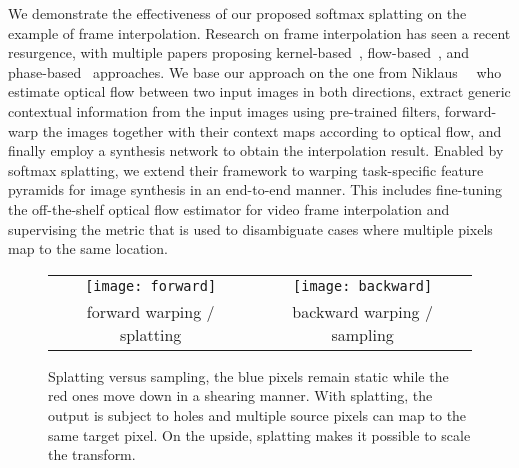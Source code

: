 \documentclass[10pt,twocolumn,letterpaper]{article}
\newlength{\itemwidth}
\begin{document}
We demonstrate the effectiveness of our proposed softmax splatting on the example of frame interpolation. Research on frame interpolation has seen a recent resurgence, with multiple papers proposing kernel-based~\cite{Bao_CVPR_2019, Bao_ARXIV_2018, Niklaus_CVPR_2017, Niklaus_ICCV_2017}, flow-based~\cite{Bao_CVPR_2019, Bao_ARXIV_2018, Jiang_CVPR_2018, Liu_AAAI_2019, Liu_ICCV_2017, Niklaus_CVPR_2018, Raket_OTHER_2012, Reda_ICCV_2019, Xue_IJCV_2019}, and phase-based~\cite{Meyer_CVPR_2018, Meyer_CVPR_2015} approaches. We base our approach on the one from Niklaus~\etal~\cite{Niklaus_CVPR_2018} who estimate optical flow between two input images in both directions, extract generic contextual information from the input images using pre-trained filters, forward-warp the images together with their context maps according to optical flow, and finally employ a synthesis network to obtain the interpolation result. Enabled by softmax splatting, we extend their framework to warping task-specific feature pyramids for image synthesis in an end-to-end manner. This includes fine-tuning the off-the-shelf optical flow estimator for video frame interpolation and supervising the metric that is used to disambiguate cases where multiple pixels map to the same location.

\begin{figure}\centering
    \setlength{\tabcolsep}{0.2cm}
    \setlength{\itemwidth}{4.25cm}
    \hspace*{-\tabcolsep}\begin{tabular}{cc}
            \texttt{[image: forward]}
        &
            \texttt{[image: backward]}
        \\
            \footnotesize forward warping / splatting
        &
            \footnotesize backward warping / sampling
        \\
    \end{tabular}\vspace{-0.2cm}
    \caption{Splatting versus sampling, the blue pixels remain static while the red ones move down in a shearing manner. With splatting, the output is subject to holes and multiple source pixels can map to the same target pixel. On the upside, splatting makes it possible to scale the transform.}\vspace{-0.3cm}
	\label{fig:wapring}
\end{figure}
\end{document}
